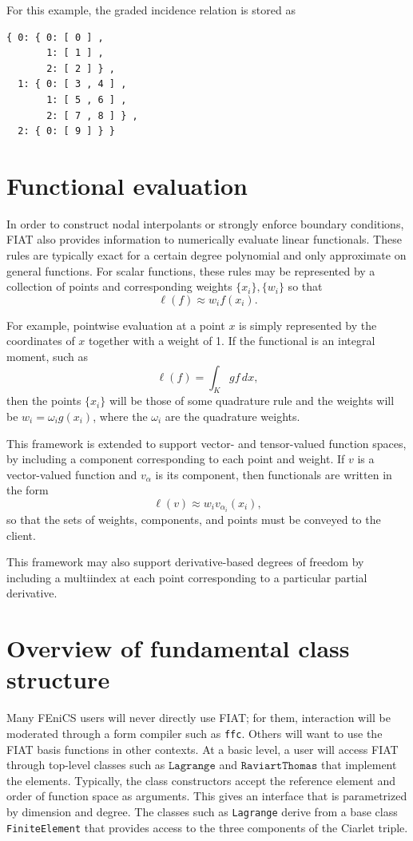 For this example, the graded incidence relation is stored as
\begin{verbatim}
{ 0: { 0: [ 0 ] ,
       1: [ 1 ] ,
       2: [ 2 ] } ,
  1: { 0: [ 3 , 4 ] ,
       1: [ 5 , 6 ] ,
       2: [ 7 , 8 ] } ,
  2: { 0: [ 9 ] } }
\end{verbatim}

\section{Functional evaluation}
In order to construct nodal interpolants or strongly enforce boundary
conditions, FIAT also provides information to numerically evaluate
linear functionals.  These rules are typically exact for a certain
degree polynomial and only approximate on general functions.  For
scalar functions, these rules may be represented by a collection of
points and corresponding weights \( \{ x_i \} , \{ w_i \} \) so that
\[
\ell( f ) \approx w_i f(x_i).
\]

For example, pointwise evaluation at a point \( x \) is simply
represented by the coordinates of \( x \) together with a weight of
1. If the functional is an integral moment, such as
\[
\ell( f ) = \int_K g f \, dx,
\]
then the points \( \{ x_i \} \) will be those of some quadrature rule
and the weights will be \( w_i = \omega_i g(x_i) \), where the \(
\omega_i \) are the quadrature weights.

This framework is extended to support vector- and tensor-valued
function spaces, by including a component corresponding to each point
and weight.  If \( v \) is a vector-valued function and \( v_\alpha \)
is its component, then functionals are written in the form
\[
\ell( v ) \approx w_i v_{\alpha_i}(x_i),
\]
so that the sets of weights, components, and points must be conveyed
to the client.

This framework may also support derivative-based degrees of freedom by
including a multiindex at each point corresponding to a particular
partial derivative.



\section{Overview of fundamental class structure}
Many FEniCS users will never directly use FIAT; for them, interaction will be
moderated through a form compiler such as \texttt{ffc}.  Others will
want to use the FIAT basis functions in other contexts.
At a basic level, a user will access FIAT through top-level classes such as \(
\texttt{Lagrange} \) and \( \texttt{RaviartThomas} \) that implement
the elements.  Typically, the class
constructors accept the reference element and order of function space as
arguments.  This gives an interface that is parametrized by dimension
and degree.  The classes such as \texttt{Lagrange} derive from a base class
\texttt{FiniteElement} that provides access to the three components of
the Ciarlet triple.

